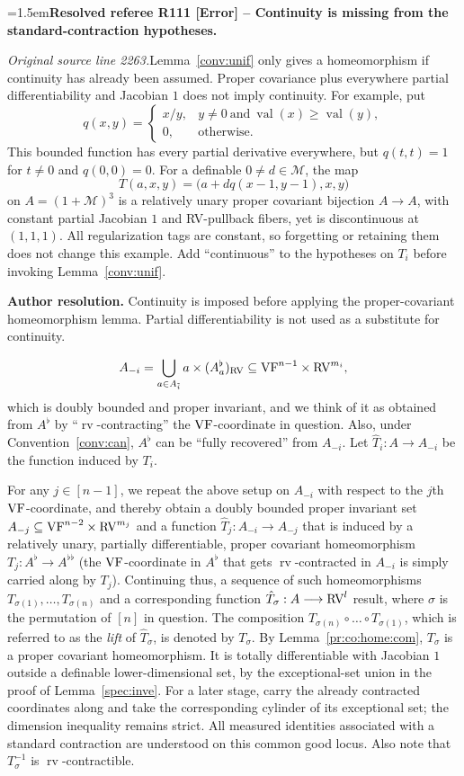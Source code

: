 \documentclass[12pt]{amsart}
\newcommand{\ResolvedRefereeRemark}[5]{%
  \par\medskip\begingroup\normalfont\small\color{gray}%
  \emergencystretch=1.5em\noindent\textbf{Resolved referee R#1 [#2] -- #3.}\par\nobreak\noindent #4\par
  \medskip\color{ResolutionGreen}\noindent\textbf{Author resolution.} #5\par
  \endgroup\medskip
}
\newcommand{\memph}[1]{{\color{magenta}\emph{#1}}}
\theoremstyle{plain}
\theoremstyle{definition}
\theoremstyle{remark}
\numberwithin{equation}{section}
\theoremstyle{plain}
\newcommand{\VF}{\textup{VF}}
\newcommand{\RV}{\textup{RV}}
\newcommand{\MM}{\mdl M}
\newcommand{\0}{\emptyset}
\newcommand{\mdl}[1]{\mathcal{#1}}  %
\newcommand{\fun}{\longrightarrow}
\newcommand{\sub}{\subseteq}
\DeclareMathOperator{\rv}{rv}
\DeclareMathOperator{\vv}{val}
\begin{document}
\ResolvedRefereeRemark{111}{Error}{Continuity is missing from the standard-contraction hypotheses}{%
\textit{Original source line 2263.}\quad Lemma~\ref{conv:unif} only gives a homeomorphism if continuity has already been assumed. Proper covariance plus everywhere partial differentiability and Jacobian $1$ does not imply continuity. For example, put
\[
q(x,y)=\begin{cases}x/y,&y\ne0\ \text{and}\ \vv(x)\geq\vv(y),\\0,&\text{otherwise}.\end{cases}
\]
This bounded function has every partial derivative everywhere, but $q(t,t)=1$ for $t\ne0$ and $q(0,0)=0$. For a definable $0\ne d\in\MM$, the map
\[
T(a,x,y)=\bigl(a+dq(x-1,y-1),x,y\bigr)
\]
on $A=(1+\MM)^3$ is a relatively unary proper covariant bijection $A\to A$, with constant partial Jacobian $1$ and RV-pullback fibers, yet is discontinuous at $(1,1,1)$. All regularization tags are constant, so forgetting or retaining them does not change this example. Add ``continuous'' to the hypotheses on $T_i$ before invoking Lemma~\ref{conv:unif}.
}{Continuity is imposed before applying the proper-covariant homeomorphism lemma. Partial differentiability is not used as a substitute for continuity.}
\[
 A_{-i} = \bigcup_{a \in A_{\tilde i}} a \times (A_{a}^\flat)_{\RV} \sub \VF^{n-1} \times \RV^{m_i},
\]
which is doubly bounded and proper invariant, and  we think of it as obtained from $A^\flat$ by ``$\rv$-contracting'' the $\VF$-coordinate in question.  Also, under Convention~\ref{conv:can}, $A^\flat$ can be ``fully recovered'' from  $A_{-i}$. Let $\hat T_i : A \fun A_{-i}$ be the function induced by $T_i$.

For any $j \in [n{-}1]$, we repeat the above setup on $A_{-i}$ with respect to the $j$th $\VF$-coordinate, and thereby obtain a doubly bounded proper invariant set $A_{-j} \sub \VF^{n-2} \times \RV^{m_j}$ and a function $\hat T_{j} : A_{-i} \fun A_{-j}$ that is induced by a relatively unary, partially differentiable, proper covariant homeomorphism $T_j : A^\flat \fun A^{\flat\flat}$ (the $\VF$-coordinate in $A^\flat$ that gets $\rv$-contracted in $A_{-i}$ is simply carried along by $T_j$). Continuing thus,  a sequence of such homeomorphisms  $T_{\sigma(1)}, \ldots, T_{\sigma(n)}$ and a corresponding function $\hat T_{\sigma} : A \fun \RV^{l}$ result, where $\sigma$ is the permutation of $[n]$ in question. The composition $T_{\sigma(n)} \circ \ldots \circ T_{\sigma(1)}$, which is referred to as the \memph{lift} of $\hat T_{\sigma}$, is denoted by $T_{\sigma}$. By Lemma~\ref{pr:co:home:com}, $T_{\sigma}$ is a proper covariant homeomorphism. It is totally differentiable with Jacobian $1$ outside a definable lower-dimensional set, by the exceptional-set union in the proof of Lemma~\ref{spec:inve}. For a later stage, carry the already contracted coordinates along and take the corresponding cylinder of its exceptional set; the dimension inequality remains strict. All measured identities associated with a standard contraction are understood on this common good locus. Also note that $T^{-1}_{\sigma}$ is $\rv$-contractible.
\end{document}
